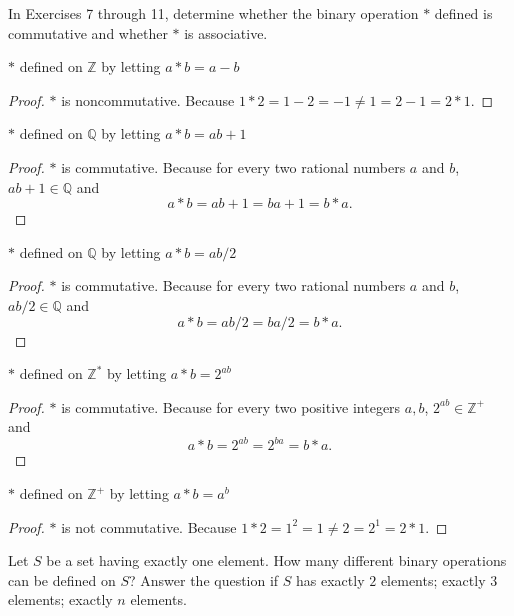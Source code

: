 In Exercises 7 through 11, determine whether the binary operation $*$ defined is commutative and whether $*$ is associative.

\begin{exercise}
    $*$ defined on $\mathbb{Z}$ by letting $a * b = a - b$
\end{exercise}

\begin{proof}
    $*$ is noncommutative. Because $1 * 2 = 1 - 2 = -1 \ne 1 = 2 - 1 = 2 * 1$.
\end{proof}

\begin{exercise}
    $*$ defined on $\mathbb{Q}$ by letting $a * b = ab + 1$
\end{exercise}

\begin{proof}
    $*$ is commutative. Because for every two rational numbers $a$ and $b$, $ab + 1\in\mathbb{Q}$ and
    \[
        a * b = ab + 1 = ba + 1 = b * a.
    \]
\end{proof}

\begin{exercise}
    $*$ defined on $\mathbb{Q}$ by letting $a * b = ab/2$
\end{exercise}

\begin{proof}
    $*$ is commutative. Because for every two rational numbers $a$ and $b$, $ab/2\in\mathbb{Q}$ and
    \[
        a * b = ab/2 = ba/2 = b * a.
    \]
\end{proof}

\begin{exercise}
    $*$ defined on $\mathbb{Z}^{*}$ by letting $a * b = 2^{ab}$
\end{exercise}

\begin{proof}
    $*$ is commutative. Because for every two positive integers $a, b$, $2^{ab}\in\mathbb{Z}^{+}$ and
    \[
        a * b = 2^{ab} = 2^{ba} = b * a.
    \]
\end{proof}

\begin{exercise}
    $*$ defined on $\mathbb{Z}^{+}$ by letting $a * b = a^{b}$
\end{exercise}

\begin{proof}
    $*$ is not commutative. Because $1 * 2 = 1^{2} = 1 \ne 2 = 2^{1} = 2 * 1$.
\end{proof}

\begin{exercise}
    Let $S$ be a set having exactly one element. How many different binary operations can be defined on $S$? Answer the question if $S$ has exactly $2$ elements; exactly $3$ elements; exactly $n$ elements.
\end{exercise}

